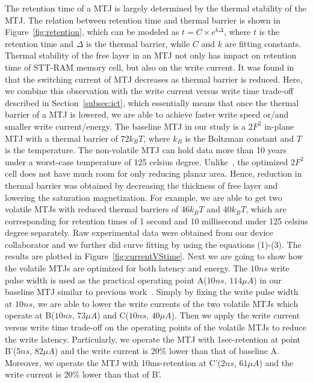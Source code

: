The retention time of a MTJ is largely determined by the thermal stability of the MTJ. The relation
between retention time and thermal barrier is shown in Figure~\ref{fig:retention}, which can be
modeled as $t=C\times e^{k\Delta}$, where $t$ is the retention time and $\Delta$ is the thermal
barrier, while $C$ and $k$ are fitting constants. Thermal stability of the free layer in an MTJ not
only has impact on retention time of STT-RAM memory cell, but also on the write current. It was found
in~\cite{PMTJ:Toshiba08} that the switching current of MTJ decreases as thermal barrier is reduced. Here, we combine this observation with the write current versus write time trade-off described in Section~\ref{subsec:ict}, which essentially means that once the thermal barrier of a MTJ is lowered, we are able to achieve faster write speed or/and smaller write current/energy. The baseline MTJ in our study is a $2F^2$ in-plane MTJ with a thermal barrier of $72k_{B}T$, where $k_{B}$ is the Boltzman constant and $T$ is the temperature. The non-volatile MTJ can hold data more than 10 years under a worst-case temperature of 125 celsius degree. Unlike~\cite{STTRAM:HPCA11}, the optimized $2F^2$ cell does not have much room for only reducing planar area. Hence, reduction in thermal barrier was obtained by decreasing the thickness of free layer and lowering the saturation magnetization. For example, we are able to get two volatile MTJs with reduced thermal barriers of $46k_{B}T$ and $40k_{B}T$, which are corresponding for retention times of 1 second and 10 millisecond under 125 celsius degree separately. Raw experimental data were obtained from our device collaborator and we further did curve fitting by using the equations (1)-(3). The results are plotted in Figure~\ref{fig:currentVStime}. Next we are going to show how the volatile MTJs are optimized for both latency and energy. The $10ns$ write pulse width is used as the practical operating point A($10ns$, $114\mu A$) in our baseline MTJ similar to previous work~\cite{CACTI:DAC08:Dong}. Simply by fixing the write pulse width at $10ns$, we are able to lower the write currents of the two volatile MTJs which operate at B($10ns$, $73\mu A$) and C($10ns$, $40\mu A$). Then we apply the write current versus write time trade-off on the operating points of the volatile MTJs to reduce the write latency. Particularly, we operate the MTJ with 1sec-retention at point B'($5ns$, $82\mu A$) and the write current is 20\% lower than that of baseline A. Moreover, we operate the MTJ with 10ms-retention at C'($2ns$, $61\mu A$) and the write current is 20\% lower than that of B'.

